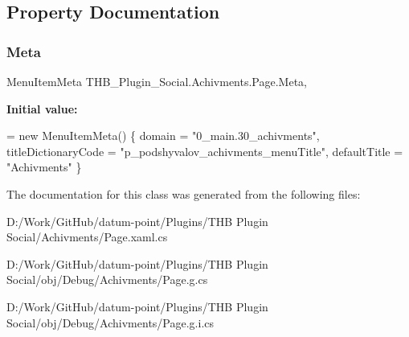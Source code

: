 \subsection{Property Documentation}
\mbox{\label{class_t_h_b___plugin___social_1_1_achivments_1_1_page_a2638356766eaf9036434f5623887b31d}} 
\subsubsection{\texorpdfstring{Meta}{Meta}}
{\footnotesize\ttfamily Menu\+Item\+Meta T\+H\+B\+\_\+\+Plugin\+\_\+\+Social.\+Achivments.\+Page.\+Meta\hspace{0.3cm}{\ttfamily [get]}, {\ttfamily [set]}}

{\bfseries Initial value\+:}
\begin{DoxyCode}
= \textcolor{keyword}{new} MenuItemMeta()
        \{
            domain = \textcolor{stringliteral}{"0\_main.30\_achivments"},
            titleDictionaryCode = \textcolor{stringliteral}{"p\_podshyvalov\_achivments\_menuTitle"},
            defaultTitle = \textcolor{stringliteral}{"Achivments"}
        \}
\end{DoxyCode}


The documentation for this class was generated from the following files\+:\begin{DoxyCompactItemize}
\item 
D\+:/\+Work/\+Git\+Hub/datum-\/point/\+Plugins/\+T\+H\+B Plugin Social/\+Achivments/Page.\+xaml.\+cs\item 
D\+:/\+Work/\+Git\+Hub/datum-\/point/\+Plugins/\+T\+H\+B Plugin Social/obj/\+Debug/\+Achivments/Page.\+g.\+cs\item 
D\+:/\+Work/\+Git\+Hub/datum-\/point/\+Plugins/\+T\+H\+B Plugin Social/obj/\+Debug/\+Achivments/Page.\+g.\+i.\+cs\end{DoxyCompactItemize}
